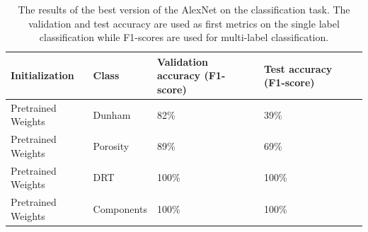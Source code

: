 \begin{table}
\caption{\label{tab:alexbest} The results of the best version of the AlexNet on the classification task. The validation and test accuracy are used as first metrics on the single label classification while F1-scores are used for multi-label classification.}
\centering
\begin{tabular}[b]{| l | l | l | l | l |}
\hline
    Initialization & Class & Validation accuracy (F1-score) & Test accuracy (F1-score) \ \\ \hline
    Pretrained Weights & Dunham &  82\%  & 39\% \\ \hline
    Pretrained Weights & Porosity & 89\%  &  69\% \\ \hline
    Pretrained Weights &DRT & 100\% &  100\% \\ \hline
    Pretrained Weights &Components & 100\% &  100\% \\ \hline
\end{tabular} 
\end{table}

